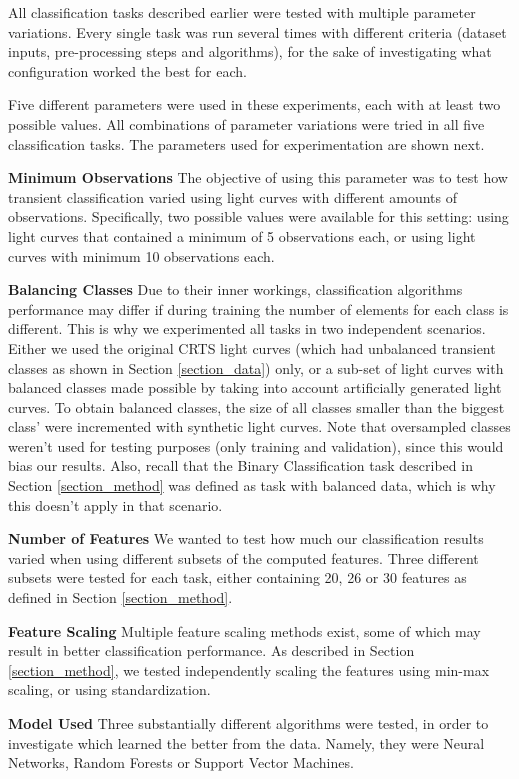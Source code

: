 All classification tasks described earlier were tested with multiple parameter variations. Every single task was run several times with different criteria (dataset inputs, pre-processing steps and algorithms), for the sake of investigating what configuration worked the best for each.

Five different parameters were used in these experiments, each with at least two possible values. All combinations of parameter variations were tried in all five classification tasks. The parameters used for experimentation are shown next.

\begin{description}
    \item \textbf{Minimum Observations} The objective of using this parameter was to test how transient classification varied using light curves with different amounts of observations. Specifically, two possible values were available for this setting: using light curves that contained a minimum of 5 observations each, or using light curves with minimum 10 observations each.
    \item \textbf{Balancing Classes} Due to their inner workings, classification algorithms performance may differ if during training the number of elements for each class is different. This is why we experimented all tasks in two independent scenarios. Either we used the original CRTS light curves (which had unbalanced transient classes as shown in Section \ref{section_data}) only, or a sub-set of light curves with balanced classes made possible by taking into account artificially generated light curves. To obtain balanced classes, the size of all classes smaller than the biggest class' were incremented with synthetic light curves. Note that oversampled classes weren't used for testing purposes (only training and validation), since this would bias our results. Also, recall that the Binary Classification task described in Section \ref{section_method} was defined as task with balanced data, which is why this doesn't apply in that scenario.
    \item \textbf{Number of Features} We wanted to test how much our classification results varied when using different subsets of the computed features. Three different subsets were tested for each task, either containing 20, 26 or 30 features as defined in Section \ref{section_method}.
    \item \textbf{Feature Scaling} Multiple feature scaling methods exist, some of which may result in better classification performance. As described in Section \ref{section_method}, we tested independently scaling the features using min-max scaling, or using standardization.
    \item \textbf{Model Used} Three substantially different algorithms were tested, in order to investigate which learned the better from the data. Namely, they were Neural Networks, Random Forests or Support Vector Machines.
\end{description}
